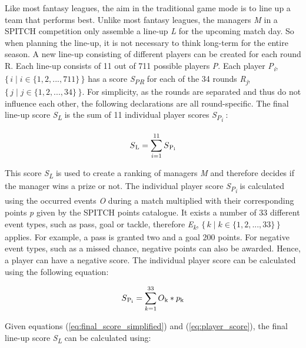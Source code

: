 Like most fantasy leagues, the aim in the traditional game mode is to line up a team that performs best. Unlike most fantasy leagues, the managers \emph{M} in a SPITCH competition only assemble a line-up \emph{L} for the upcoming match day. So when planning the line-up, it is not necessary to think long-term for the entire season. A new line-up consisting of different players can be created for each round R. Each line-up consists of 11 out of 711 possible players \emph{P}. Each player \emph{P\textsubscript{i}}, $\{\,i \mid i \in \{1, 2, ..., 711\}\,\}$ has a score \emph{S\textsubscript{PR}} for each of the 34 rounds \emph{R\textsubscript{j}}, $\{\, j \mid j \in \{1, 2, ..., 34\}\,\}$. For simplicity, as the rounds are separated and thus do not influence each other, the following declarations are all round-specific. The final line-up score \emph{S\textsubscript{L}} is the sum of 11 individual player scores \emph{S\textsubscript{P\textsubscript{i}}} :

\begin{equation}
    S\textsubscript{L} = \sum_{i=1}^{11} S\textsubscript{P\textsubscript{i}}
    \label{eq:final_score_simplified}
\end{equation}

This score \emph{S\textsubscript{L}} is used to create a ranking of managers \emph{M} and therefore decides if the manager wins a prize or not. The individual player score \emph{S\textsubscript{P\textsubscript{i}}} is calculated using the occurred events \emph{O} during a match multiplied with their corresponding points \emph{p} given by the SPITCH points catalogue. It exists a number of 33 different event types, such as pass, goal or tackle, therefore \emph{E\textsubscript{k}}, $\{\, k \mid k \in \{1, 2, ..., 33\}\,\}$ applies. For example, a pass is granted two and a goal 200 points. For negative event types, such as a missed chance, negative points can also be awarded. \parencite[cf.][]{spitch_points_nodate} Hence, a player can have a negative score. The individual player score can be calculated using the following equation:

\begin{equation}
    S\textsubscript{P\textsubscript{i}} = \sum_{k=1}^{33} O\textsubscript{k} * p\textsubscript{k}
    \label{eq:player_score}
\end{equation}

Given equations (\ref{eq:final_score_simplified}) and (\ref{eq:player_score}), the final line-up score \emph{S\textsubscript{L}} can be calculated using:

